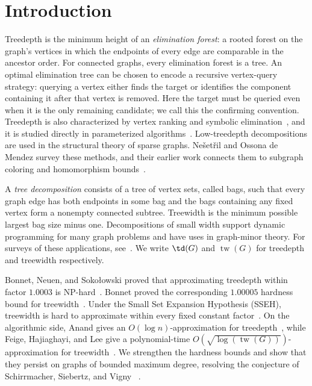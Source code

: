 ﻿\section{Introduction}
\label{sec:introduction}

Treedepth is the minimum height of an \emph{elimination forest}: a rooted forest on
the graph's vertices in which the endpoints of every edge are comparable in the
ancestor order. For connected graphs, every elimination forest is a tree.
An optimal elimination tree can be chosen to encode a recursive
vertex-query strategy: querying a vertex either finds the target or
identifies the component containing it after that vertex is removed.
Here the target must be queried even when it is the only remaining
candidate; we call this the confirming convention.
Treedepth is also characterized by vertex ranking and
symbolic elimination~\cite{BodlaenderRankings}, and it is studied directly in
parameterized algorithms~\cite{Reidl2014}. Low-treedepth decompositions are
used in the structural theory of sparse graphs. Nešetřil and Ossona de Mendez
survey these methods, and their earlier work connects them to subgraph coloring
and homomorphism bounds~\cite{LowTreeDepthSurvey,TreeDepthColoring}.

A \emph{tree decomposition} consists of a tree of vertex sets, called bags,
such that every graph edge has both endpoints in some bag and the bags
containing any fixed vertex form a nonempty connected subtree. Treewidth is the minimum
possible largest bag size minus one. Decompositions of small width support
dynamic programming for many graph problems and have uses in graph-minor
theory. For surveys of these applications, see~\cite{BodlaenderTouristGuide,
BodlaenderApplications}. We write $\td(G)$ and $\operatorname{tw}(G)$ for treedepth and treewidth respectively.

Bonnet, Neuen, and Soko\l owski proved that approximating
treedepth within factor $1.0003$ is NP-hard~\cite{BNS}. Bonnet proved the
corresponding $1.00005$ hardness bound for treewidth~\cite{BonnetTreewidth}.
Under the Small Set Expansion Hypothesis (SSEH), treewidth is hard to
approximate within every fixed constant factor~\cite[Theorem~1.1]{APW}. On the
algorithmic side, Anand gives an $O(\log n)$-approximation for
treedepth~\cite{Anand2026}, while Feige, Hajiaghayi, and Lee give a polynomial-time
$O(\sqrt{\log(\operatorname{tw}(G))})$-approximation for
treewidth~\cite{FeigeHajiaghayiLee2005}. We strengthen the hardness bounds and
show that they persist on graphs of bounded maximum degree, resolving the
conjecture of Schirrmacher, Siebertz, and Vigny
~\cite[Conjecture~1]{SchirrmacherSiebertzVigny2025}.

